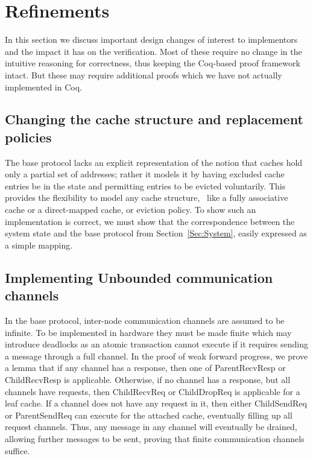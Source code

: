 \section{Refinements}
\label{Sec:Refinements}

In this section we discuss important design changes of interest to implementors
and the impact it has on the verification. Most of these require no change in
the intuitive reasoning for correctness, thus keeping the Coq-based proof
framework intact. But these may require additional proofs which we have not
actually implemented in Coq.


\subsection{Changing the cache structure and replacement policies}

The base protocol lacks an explicit representation of the notion that
caches hold only a partial set of addresses; rather it models it by
having excluded cache entries be in the \In{} state and permitting
entries to be evicted voluntarily. This provides the flexibility to
model any cache structure, \eg\ like a fully associative cache or a
direct-mapped cache, or eviction policy. To show such an
implementation is correct, we must show that the correspondence
between the system state and the base protocol from
Section~\ref{Sec:System}, easily expressed as a simple mapping.


\subsection{Implementing Unbounded communication channels}

In the base protocol, inter-node communication channels are assumed to
be infinite. To be implemented in hardware they must be made finite
which may introduce deadlocks as an atomic transaction cannot execute
if it requires sending a message through a full channel. In the proof
of weak forward progress, we prove a lemma that if any channel has a
response, then one of ParentRecvResp or ChildRecvResp is
applicable. Otherwise, if no channel has a response, but all channels
have requests, then ChildRecvReq or ChildDropReq is applicable for a
leaf cache. If a channel does not have any request in it, then either
ChildSendReq or ParentSendReq can execute for the attached cache,
eventually filling up all request channels.  Thus, any message in any
channel will eventually be drained, allowing further messages to be
sent, proving that finite communication channels suffice.


